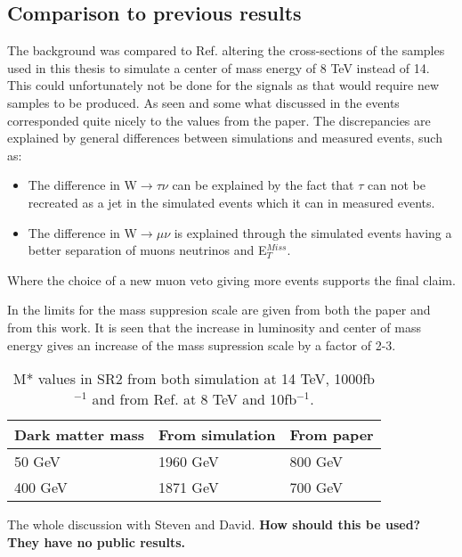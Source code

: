 \subsection{Comparison to previous results}
The background was compared to Ref. \citep{ATLAS-CONF-2012-147} altering the cross-sections of the samples used in this thesis to simulate a center of mass energy of 8 TeV instead of 14. This could unfortunately not be done for the signals as that would require new samples to be produced. As seen and some what discussed in  the events corresponded quite nicely to the values from the paper. The discrepancies are explained by general differences between simulations and measured events, such as:
\begin{itemize}
\item The difference in W$\rightarrow\tau\nu$ can be explained by the fact that $\tau$ can not be recreated as a jet in the simulated events which it can in measured events.

\item The difference in W$\rightarrow\mu\nu$ is explained through the simulated events having a better separation of muons neutrinos and E$_T^{Miss}$.
\end{itemize}
Where the choice of a new muon veto giving more events supports the final claim.

In  the limits for the mass suppresion scale are given from both the paper and from this work. It is seen that the increase in luminosity and center of mass energy gives an increase of the mass supression scale by a factor of 2-3.

\begin{table}[ht]
\begin{center}
\begin{tabular}{|l|l|l|}
\hline
Dark matter mass & From simulation & From paper \\ \hline
50 GeV & 1960 GeV &800 GeV \\
400 GeV & 1871 GeV & 700 GeV \\ \hline
\end{tabular}
\caption{M* values in SR2 from both simulation at 14 TeV, 1000fb$^{-1}$ and from Ref. \citep{ATLAS-CONF-2012-147} at 8 TeV and 10fb$^{-1}$. }
\label{Comp pval}
\end{center}
\end{table}

The whole discussion with Steven and David. \textbf{How should this be used? They have no public results.}

